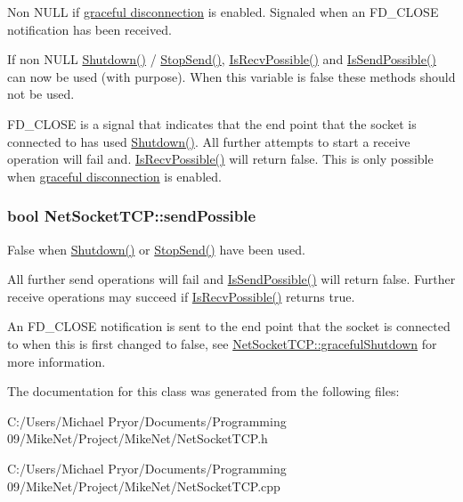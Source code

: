 Non NULL if \hyperlink{graceful_disconnect_page}{graceful disconnection} is enabled. Signaled when an {\ttfamily FD\_\-CLOSE} notification has been received. 

If non NULL \hyperlink{class_net_socket_t_c_p_a31775717fef7b062f9af098ca5e6b7c9}{Shutdown()} / \hyperlink{class_net_socket_t_c_p_a71e478845fc449fc9fccaa098db37c50}{StopSend()}, \hyperlink{class_net_socket_t_c_p_a1e1063d77e9ae490c4c5146136141199}{IsRecvPossible()} and \hyperlink{class_net_socket_t_c_p_a3bfb846d84dd1f29ece510f025adba3d}{IsSendPossible()} can now be used (with purpose). When this variable is false these methods should not be used.\par
\par


{\ttfamily FD\_\-CLOSE} is a signal that indicates that the end point that the socket is connected to has used \hyperlink{class_net_socket_t_c_p_a31775717fef7b062f9af098ca5e6b7c9}{Shutdown()}. All further attempts to start a receive operation will fail and. \hyperlink{class_net_socket_t_c_p_a1e1063d77e9ae490c4c5146136141199}{IsRecvPossible()} will return false. This is only possible when \hyperlink{graceful_disconnect_page}{graceful disconnection} is enabled. \hypertarget{class_net_socket_t_c_p_a405f72b045af06f88730b1b239dfe61d}{
\subsubsection[{sendPossible}]{\setlength{\rightskip}{0pt plus 5cm}bool {\bf NetSocketTCP::sendPossible}}}
\label{class_net_socket_t_c_p_a405f72b045af06f88730b1b239dfe61d}


False when \hyperlink{class_net_socket_t_c_p_a31775717fef7b062f9af098ca5e6b7c9}{Shutdown()} or \hyperlink{class_net_socket_t_c_p_a71e478845fc449fc9fccaa098db37c50}{StopSend()} have been used. 

All further send operations will fail and \hyperlink{class_net_socket_t_c_p_a3bfb846d84dd1f29ece510f025adba3d}{IsSendPossible()} will return false. Further receive operations may succeed if \hyperlink{class_net_socket_t_c_p_a1e1063d77e9ae490c4c5146136141199}{IsRecvPossible()} returns true.\par
\par


An {\ttfamily FD\_\-CLOSE} notification is sent to the end point that the socket is connected to when this is first changed to false, see \hyperlink{class_net_socket_t_c_p_a59ecfff878b08596b570c17ae57b93b9}{NetSocketTCP::gracefulShutdown} for more information. 

The documentation for this class was generated from the following files:\begin{DoxyCompactItemize}
\item 
C:/Users/Michael Pryor/Documents/Programming 09/MikeNet/Project/MikeNet/NetSocketTCP.h\item 
C:/Users/Michael Pryor/Documents/Programming 09/MikeNet/Project/MikeNet/NetSocketTCP.cpp\end{DoxyCompactItemize}
